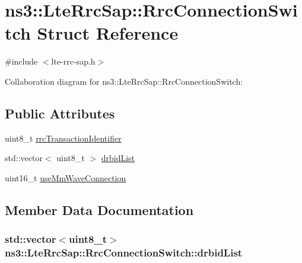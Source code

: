 \hypertarget{structns3_1_1LteRrcSap_1_1RrcConnectionSwitch}{}\section{ns3\+:\+:Lte\+Rrc\+Sap\+:\+:Rrc\+Connection\+Switch Struct Reference}
\label{structns3_1_1LteRrcSap_1_1RrcConnectionSwitch}


{\ttfamily \#include $<$lte-\/rrc-\/sap.\+h$>$}



Collaboration diagram for ns3\+:\+:Lte\+Rrc\+Sap\+:\+:Rrc\+Connection\+Switch\+:
\subsection*{Public Attributes}
\begin{DoxyCompactItemize}
\item 
uint8\+\_\+t \hyperlink{structns3_1_1LteRrcSap_1_1RrcConnectionSwitch_a021a528acde54bc37e6e4580581e7b63}{rrc\+Transaction\+Identifier}
\item 
std\+::vector$<$ uint8\+\_\+t $>$ \hyperlink{structns3_1_1LteRrcSap_1_1RrcConnectionSwitch_a7a984276a6f8a5c9ec93daeeb7cf005c}{drbid\+List}
\item 
uint16\+\_\+t \hyperlink{structns3_1_1LteRrcSap_1_1RrcConnectionSwitch_a9b44955f7fbd9febc3d1c1a57abbc1b3}{use\+Mm\+Wave\+Connection}
\end{DoxyCompactItemize}


\subsection{Member Data Documentation}
\subsubsection[{\texorpdfstring{drbid\+List}{drbidList}}]{\setlength{\rightskip}{0pt plus 5cm}std\+::vector$<$uint8\+\_\+t$>$ ns3\+::\+Lte\+Rrc\+Sap\+::\+Rrc\+Connection\+Switch\+::drbid\+List}\hypertarget{structns3_1_1LteRrcSap_1_1RrcConnectionSwitch_a7a984276a6f8a5c9ec93daeeb7cf005c}{}\label{structns3_1_1LteRrcSap_1_1RrcConnectionSwitch_a7a984276a6f8a5c9ec93daeeb7cf005c}
